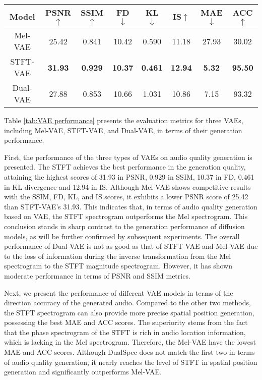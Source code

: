 \documentclass{IEEEtran}
\begin{document}
\begin{table*}[t]
    \centering
    \caption{Evaluation results for different VAE reconstruction performances.}
    \label{tab:VAE performance}
    \setlength{\tabcolsep}{6.3mm}
    \begin{tabular}{cccccccc}
        \toprule
        \textbf{Model} & \textbf{PSNR$\uparrow$} & \textbf{SSIM$\uparrow$} & \textbf{FD$\downarrow$} & \textbf{KL$\downarrow$} & \textbf{IS$\uparrow$} & \textbf{MAE$\downarrow$} & \textbf{ACC$\uparrow$} \\
        \midrule
        Mel-VAE & 25.42 & 0.841 & 10.42 & 0.590 & 11.18 & 27.93 & 30.02 \\
        STFT-VAE & \textbf{31.93} & \textbf{0.929} & \textbf{10.37} & \textbf{0.461} & \textbf{12.94} & \textbf{5.32} & \textbf{95.50} \\
        Dual-VAE & 27.88 & 0.853 & 10.66 & 1.031 & 10.86 & 7.15 & 93.32 \\
        \bottomrule
    \end{tabular}
\end{table*}

Table \ref{tab:VAE performance} presents the evaluation metrics for three VAEs, including Mel-VAE, STFT-VAE, and Dual-VAE, in terms of their generation performance.

{First, the performance of the three types of VAEs on audio quality generation is presented. The STFT achieves the best performance in the generation quality, attaining the highest scores of 31.93 in PSNR, 0.929 in SSIM, 10.37 in FD, 0.461 in KL divergence and 12.94 in IS. Although Mel-VAE shows competitive results with the SSIM, FD, KL, and IS scores, it exhibits a lower PSNR score of 25.42 than STFT-VAE's 31.93. This indicates that, in terms of audio quality generation based on VAE, the STFT spectrogram outperforms the Mel spectrogram. This conclusion stands in sharp contrast to the generation performance of diffusion models, as will be further confirmed by subsequent experiments. The overall performance of Dual-VAE is not as good as that of STFT-VAE and Mel-VAE due to the loss of information during the inverse transformation from the Mel spectrogram to the STFT magnitude spectrogram. However, it has shown moderate performance in terms of PSNR and SSIM metrics. }

{Next, we present the performance of different VAE models in terms of the direction accuracy of the generated audio. Compared to the other two methods, the STFT spectrogram can also provide more precise spatial position generation, possessing the best MAE and ACC scores. The superiority stems from the fact that the phase spectrogram of the STFT is rich in audio location information, which is lacking in the Mel spectrogram. Therefore, the Mel-VAE have the lowest MAE and ACC scores. Although DualSpec does not match the first two in terms of audio quality generation, it nearly reaches the level of STFT in spatial position generation and significantly outperforms Mel-VAE.}
\end{document}
